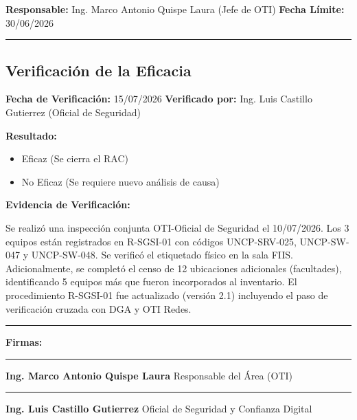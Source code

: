 \documentclass[10pt,letterpaper]{article}
\begin{document}
\textbf{Responsable:} Ing. Marco Antonio Quispe Laura (Jefe de OTI)
\textbf{Fecha Límite:} 30/06/2026

\begin{center}\rule{0.5\linewidth}{0.5pt}\end{center}

\subsection{Verificación de la
Eficacia}\label{verificaciuxf3n-de-la-eficacia}

\textbf{Fecha de Verificación:} 15/07/2026 \textbf{Verificado por:} Ing.
Luis Castillo Gutierrez (Oficial de Seguridad)

\textbf{Resultado:}

\begin{itemize}
\tightlist
\item[$\boxtimes$]
  Eficaz (Se cierra el RAC)
\item[$\square$]
  No Eficaz (Se requiere nuevo análisis de causa)
\end{itemize}

\textbf{Evidencia de Verificación:}

Se realizó una inspección conjunta OTI-Oficial de Seguridad el
10/07/2026. Los 3 equipos están registrados en R-SGSI-01 con códigos
UNCP-SRV-025, UNCP-SW-047 y UNCP-SW-048. Se verificó el etiquetado
físico en la sala FIIS. Adicionalmente, se completó el censo de 12
ubicaciones adicionales (facultades), identificando 5 equipos más que
fueron incorporados al inventario. El procedimiento R-SGSI-01 fue
actualizado (versión 2.1) incluyendo el paso de verificación cruzada con
DGA y OTI Redes.

\begin{center}\rule{0.5\linewidth}{0.5pt}\end{center}

\textbf{Firmas:}

\begin{center}\rule{0.5\linewidth}{0.5pt}\end{center}

\textbf{Ing. Marco Antonio Quispe Laura} Responsable del Área (OTI)

\begin{center}\rule{0.5\linewidth}{0.5pt}\end{center}

\textbf{Ing. Luis Castillo Gutierrez} Oficial de Seguridad y Confianza
Digital
\end{document}
